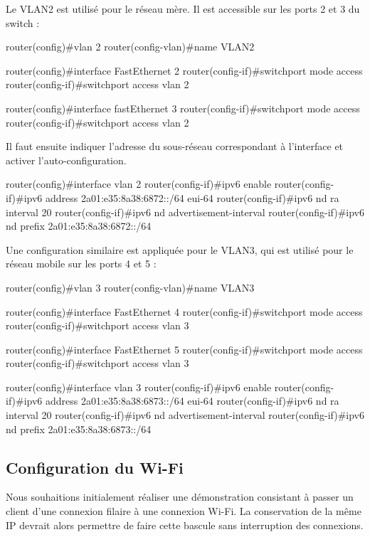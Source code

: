 Le VLAN2 est utilisé pour le réseau mère.
Il est accessible sur les ports 2 et 3 du switch :

\begin{code}
router(config)#vlan 2
router(config-vlan)#name VLAN2

router(config)#interface FastEthernet 2
router(config-if)#switchport mode access
router(config-if)#switchport access vlan 2

router(config)#interface fastEthernet 3
router(config-if)#switchport mode access
router(config-if)#switchport access vlan 2
\end{code}

Il faut ensuite indiquer l'adresse du sous-réseau correspondant à l'interface et activer l'auto-configuration.

\begin{code}
router(config)#interface vlan 2
router(config-if)#ipv6 enable                              
router(config-if)#ipv6 address 2a01:e35:8a38:6872::/64 eui-64
router(config-if)#ipv6 nd ra interval 20
router(config-if)#ipv6 nd advertisement-interval
router(config-if)#ipv6 nd prefix 2a01:e35:8a38:6872::/64
\end{code}

Une configuration similaire est appliquée pour le VLAN3, qui est utilisé pour le réseau mobile sur les ports 4 et 5 :

\begin{code}
router(config)#vlan 3
router(config-vlan)#name VLAN3

router(config)#interface FastEthernet 4
router(config-if)#switchport mode access
router(config-if)#switchport access vlan 3

router(config)#interface FastEthernet 5
router(config-if)#switchport mode access
router(config-if)#switchport access vlan 3

router(config)#interface vlan 3
router(config-if)#ipv6 enable       
router(config-if)#ipv6 address 2a01:e35:8a38:6873::/64 eui-64
router(config-if)#ipv6 nd ra interval 20
router(config-if)#ipv6 nd advertisement-interval
router(config-if)#ipv6 nd prefix 2a01:e35:8a38:6873::/64
\end{code}

\subsection{Configuration du Wi-Fi}

Nous souhaitions initialement réaliser une démonstration consistant à passer un client d'une connexion filaire à une connexion Wi-Fi.
La conservation de la même IP devrait alors permettre de faire cette bascule sans interruption des connexions.

